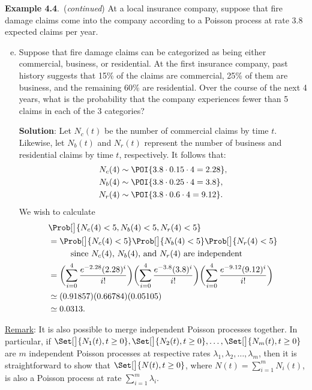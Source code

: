 \begin{Example}
    \textbf{Example 4.4}.\ (\emph{continued}) At a local insurance company, suppose that fire damage claims
    come into the company according to a Poisson process at rate 3.8 expected claims per year.
    \begin{enumerate}[(a)]
        \setcounter{enumi}{4}
        \item Suppose that fire damage claims can be categorized as being either commercial, business,
              or residential. At the first insurance company, past history suggests that 15\% of the claims are
              commercial, 25\% of them are business, and the remaining 60\% are residential. Over the
              course of the next 4 years, what is the probability that the company experiences fewer than 5
              claims in each of the 3 categories?

              \textbf{Solution}: Let $ N_c(t) $ be the number of commercial claims
              by time $ t $. Likewise, let $ N_b(t) $ and $ N_r(t) $ represent
              the number of business and residential claims by time $ t $,
              respectively. It follows that:
              \begin{align*}
                  N_c(4) & \sim \POI{3.8\cdot 0.15\cdot 4=2.28}, \\
                  N_b(4) & \sim \POI{3.8\cdot 0.25\cdot 4=3.8},  \\
                  N_r(4) & \sim \POI{3.8\cdot 0.6\cdot 4=9.12}.
              \end{align*}
              We wish to calculate
              \begin{align*}
                   & \Prob[\big]{N_c(4)<5,N_b(4)<5,N_r(4)<5}                                                  \\
                   & =\Prob[\big]{N_c(4)<5}\Prob[\big]{N_b(4)<5}\Prob[\big]{N_r(4)<5}                         \\
                   & \phantom{{}={}}\quad\text{ since $ N_c(4) $, $ N_b(4) $, and $ N_r(4) $ are independent} \\
                   & =\biggl(\sum_{i=0}^{4}\frac{e^{-2.28}(2.28)^i}{i!}\biggr)
                  \biggl(\sum_{i=0}^{4}\frac{e^{-3.8}(3.8)^i}{i!}\biggr)
                  \biggl(\sum_{i=0}^{4}\frac{e^{-9.12}(9.12)^i}{i!}\biggr)                                    \\
                   & \simeq (0.91857)(0.66784)(0.05105)                                                       \\
                   & \simeq 0.0313.
              \end{align*}
    \end{enumerate}
\end{Example}
\underline{Remark}: It is also possible to merge independent Poisson processes together. In particular, if
$ \Set[\big]{N_1(t),t\ge 0},\Set[\big]{N_2(t),t\ge 0},\ldots,\Set[\big]{N_m(t),t\ge 0} $
are $ m $ independent Poisson processes at respective rates $ \lambda_1,\lambda_2,\ldots,\lambda_m $,
then it is straightforward to show that $ \Set[\big]{N(t),t\ge 0} $, where
$ N(t)=\sum_{i=1}^{m}N_i(t) $, is also a Poisson process at rate $ \sum_{i=1}^{m}\lambda_i $.
